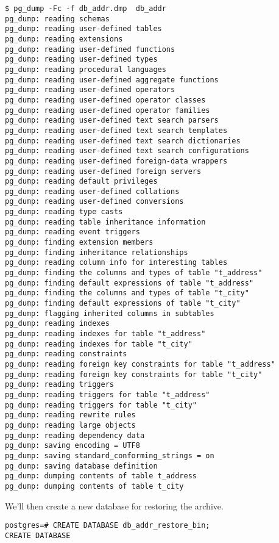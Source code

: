 \begin{verbatim}
$ pg_dump -Fc -f db_addr.dmp  db_addr
pg_dump: reading schemas
pg_dump: reading user-defined tables
pg_dump: reading extensions
pg_dump: reading user-defined functions
pg_dump: reading user-defined types
pg_dump: reading procedural languages
pg_dump: reading user-defined aggregate functions
pg_dump: reading user-defined operators
pg_dump: reading user-defined operator classes
pg_dump: reading user-defined operator families
pg_dump: reading user-defined text search parsers
pg_dump: reading user-defined text search templates
pg_dump: reading user-defined text search dictionaries
pg_dump: reading user-defined text search configurations
pg_dump: reading user-defined foreign-data wrappers
pg_dump: reading user-defined foreign servers
pg_dump: reading default privileges
pg_dump: reading user-defined collations
pg_dump: reading user-defined conversions
pg_dump: reading type casts
pg_dump: reading table inheritance information
pg_dump: reading event triggers
pg_dump: finding extension members
pg_dump: finding inheritance relationships
pg_dump: reading column info for interesting tables
pg_dump: finding the columns and types of table "t_address"
pg_dump: finding default expressions of table "t_address"
pg_dump: finding the columns and types of table "t_city"
pg_dump: finding default expressions of table "t_city"
pg_dump: flagging inherited columns in subtables
pg_dump: reading indexes
pg_dump: reading indexes for table "t_address"
pg_dump: reading indexes for table "t_city"
pg_dump: reading constraints
pg_dump: reading foreign key constraints for table "t_address"
pg_dump: reading foreign key constraints for table "t_city"
pg_dump: reading triggers
pg_dump: reading triggers for table "t_address"
pg_dump: reading triggers for table "t_city"
pg_dump: reading rewrite rules
pg_dump: reading large objects
pg_dump: reading dependency data
pg_dump: saving encoding = UTF8
pg_dump: saving standard_conforming_strings = on
pg_dump: saving database definition
pg_dump: dumping contents of table t_address
pg_dump: dumping contents of table t_city

\end{verbatim}

We'll then create a new database for restoring the archive.

\begin{lstlisting}[style=pgsql]
postgres=# CREATE DATABASE db_addr_restore_bin;
CREATE DATABASE

\end{lstlisting}

